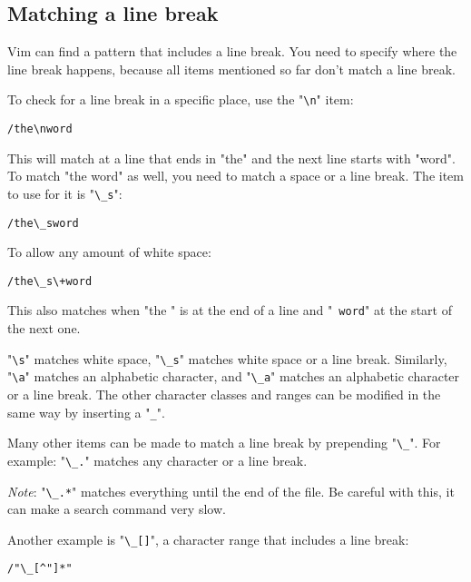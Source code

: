 \subsection{Matching a line break}
Vim can find a pattern that includes a line break.
You need to specify where the line break happens, because all items mentioned so far don't match a line break.

To check for a line break in a specific place, use the "\texttt{\textbackslash{}n}" item:

\begin{Verbatim}[samepage=true]
 /the\nword
\end{Verbatim}

This will match at a line that ends in "the" and the next line starts with "word".
To match "the word" as well, you need to match a space or a line break.
The item to use for it is "\texttt{\textbackslash{}\_s}":

\begin{Verbatim}[samepage=true]
 /the\_sword
\end{Verbatim}

To allow any amount of white space:

\begin{Verbatim}[samepage=true]
 /the\_s\+word
\end{Verbatim}

This also matches when "the  " is at the end of a line and "\texttt{   word}" at the start of the next one.

"\texttt{\textbackslash{}s}" matches white space, "\texttt{\textbackslash{}\_s}" matches white space or a line break.
Similarly, "\texttt{\textbackslash{}a}" matches an alphabetic character, and "\texttt{\textbackslash{}\_a}" matches an alphabetic character or a line break.
The other character classes and ranges can be modified in the same way by inserting a "\texttt{\_}".

Many other items can be made to match a line break by prepending "\texttt{\textbackslash{}\_}".
For example: "\texttt{\textbackslash{}\_.}" matches any character or a line break.

\emph{Note}: "\texttt{\textbackslash{}\_.*}" matches everything until the end of the file.
Be careful with this, it can make a search command very slow.

Another example is "\texttt{\textbackslash{}\_[]}", a character range that includes a line break:

\begin{Verbatim}[samepage=true]
 /"\_[^"]*"
\end{Verbatim}


